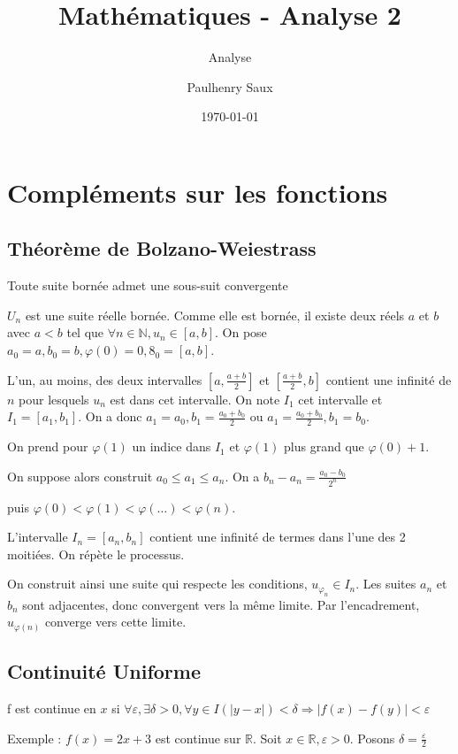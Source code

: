 \documentclass[french]{yLectureNote}
\title{Mathématiques - Analyse 2}
\subtitle{Analyse}
\author{Paulhenry Saux}
\date{\today}
\newcommand{\R}[0]{\mathbb{R}}
\begin{document}
	\chapter{Compléments sur les fonctions }
\section{Théorème de Bolzano-Weiestrass}
\begin{theorem}[Théorème de BW]
 Toute suite bornée admet une sous-suit convergente
\end{theorem}
\begin{myproof}
$U_n$ est une suite réelle bornée. Comme elle est bornée, il existe deux réels $a$ et $b$ avec $a<b$ tel que $\forall n\in\mathbb{N}, u_n \in[a,b]$. On pose $a_0 = a, b_0=b, \varphi(0) = 0, 8_0 = [a,b]$.

L'un, au moins, des deux intervalles $[a,\frac{a+b}{2}]$ et $[\frac{a+b}{2},b]$ contient une infinité de $n$ pour lesquels $u_n$ est dans cet intervalle. On note $I_1$ cet intervalle et $I_1 = [a_1,b_1]$. On a donc $a_1 = a_0, b_1 = \frac{a_0+b_0}{2}$ ou $a_1 = \frac{a_0+b_0}{2}, b_1=b_0$.

On prend pour $\varphi(1)$ un indice dans $I_1$ et $\varphi(1)$ plus grand que $\varphi(0)+1$.

On suppose alors construit $a_0 \leq a_1\leq a_n$. On a $b_n-a_n = \frac{a_0-b_0}{2^n}$

puis $\varphi(0)<\varphi(1)<\varphi(\dots)<\varphi(n)$.

L'intervalle $I_n = [a_n,b_n]$ contient une infinité de termes dans l'une des 2 moitiées. On répète le processus.

On construit ainsi une suite qui respecte les conditions, $u_{\varphi_n} \in I_n$. Les suites $a_n$ et $b_n$ sont adjacentes, donc convergent vers la m\^eme limite. Par l'encadrement, $u_{\varphi(n)}$ converge vers cette limite.
\end{myproof}
\section{Continuité Uniforme}
\begin{definition}
f est continue en $x$ si $\forall \varepsilon,\exists \delta >0, \forall y\in I (|y-x|)< \delta \Rightarrow |f(x)-f(y)| <\varepsilon$
\end{definition}
Exemple : $f(x) = 2x+3$ est continue sur $\R$. Soit $x\in \R, \varepsilon>0$. Posons $\delta = \frac{\varepsilon}{2}$
\end{document}
